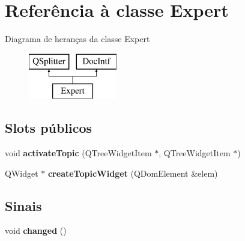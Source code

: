 \hypertarget{class_expert}{\section{Referência à classe Expert}
\label{class_expert}
}
Diagrama de heranças da classe Expert\begin{figure}[H]
\begin{center}
\leavevmode
\includegraphics[height=2.000000cm]{class_expert}
\end{center}
\end{figure}
\subsection*{Slots públicos}
\begin{DoxyCompactItemize}
\item 
\hypertarget{class_expert_a4628e5899bb6ce6ba82fd0b291d1fb1c}{void {\bfseries activate\-Topic} (Q\-Tree\-Widget\-Item $\ast$, Q\-Tree\-Widget\-Item $\ast$)}\label{class_expert_a4628e5899bb6ce6ba82fd0b291d1fb1c}

\item 
\hypertarget{class_expert_a8100bd1020b2b303e33ef27548c391b1}{Q\-Widget $\ast$ {\bfseries create\-Topic\-Widget} (Q\-Dom\-Element \&elem)}\label{class_expert_a8100bd1020b2b303e33ef27548c391b1}

\end{DoxyCompactItemize}
\subsection*{Sinais}
\begin{DoxyCompactItemize}
\item 
\hypertarget{class_expert_a5d42414aede4a6105b6956c0aca81fa0}{void {\bfseries changed} ()}\label{class_expert_a5d42414aede4a6105b6956c0aca81fa0}

\end{DoxyCompactItemize}
